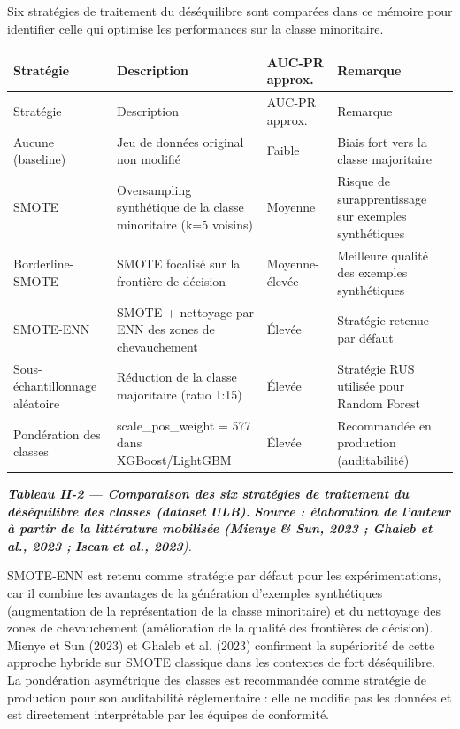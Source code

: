 Six stratégies de traitement du déséquilibre sont comparées dans ce mémoire pour identifier celle qui optimise les performances sur la classe minoritaire.

\begin{longtable}{|p{}|p{}|p{}|p{}|}
\hline
Stratégie & Description & AUC-PR approx. & Remarque \\
\hline
\endfirsthead
\hline
Stratégie & Description & AUC-PR approx. & Remarque \\
\hline
\endhead
Aucune (baseline) & Jeu de données original non modifié & Faible & Biais fort vers la classe majoritaire \\
\hline
SMOTE & Oversampling synthétique de la classe minoritaire (k=5 voisins) & Moyenne & Risque de surapprentissage sur exemples synthétiques \\
\hline
Borderline-SMOTE & SMOTE focalisé sur la frontière de décision & Moyenne-élevée & Meilleure qualité des exemples synthétiques \\
\hline
SMOTE-ENN & SMOTE + nettoyage par ENN des zones de chevauchement & Élevée & Stratégie retenue par défaut \\
\hline
Sous-échantillonnage aléatoire & Réduction de la classe majoritaire (ratio 1:15) & Élevée & Stratégie RUS utilisée pour Random Forest \\
\hline
Pondération des classes & scale\_pos\_weight = 577 dans XGBoost/LightGBM & Élevée & Recommandée en production (auditabilité) \\
\hline
\end{longtable}

\textbf{\emph{Tableau II-}}\textbf{\emph{2}}\textbf{\emph{ — Comparaison des six stratégies de traitement du déséquilibre des classes (}}\textbf{\emph{dataset}}\textbf{\emph{ ULB).}}\textbf{ }\textbf{\emph{Source : élaboration de l'auteur à partir de la littérature mobilisée (}}\textbf{\emph{Mienye}}\textbf{\emph{ \& Sun, 2023 ; Ghaleb et al., 2023 ; }}\textbf{\emph{Iscan}}\textbf{\emph{ et al., 2023}}\emph{).}

SMOTE-ENN est retenu comme stratégie par défaut pour les expérimentations, car il combine les avantages de la génération d'exemples synthétiques (augmentation de la représentation de la classe minoritaire) et du nettoyage des zones de chevauchement (amélioration de la qualité des frontières de décision). Mienye et Sun (2023) et Ghaleb et al. (2023) confirment la supériorité de cette approche hybride sur SMOTE classique dans les contextes de fort déséquilibre. La pondération asymétrique des classes est recommandée comme stratégie de production pour son auditabilité réglementaire : elle ne modifie pas les données et est directement interprétable par les équipes de conformité.

